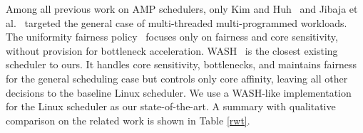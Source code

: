 Among all previous work on AMP schedulers, only Kim and Huh~\cite{kim2018exploring} and Jibaja et al.~\cite{jibaja2016portable} targeted the general case of multi-threaded multi-programmed workloads. The uniformity fairness policy~\cite{kim2018exploring} focuses only on fairness and core sensitivity, without provision for bottleneck acceleration. WASH~\cite{jibaja2016portable} is the closest existing scheduler to ours. It handles core sensitivity, bottlenecks, and maintains fairness for the general scheduling case but controls only core affinity, leaving all other decisions to the baseline Linux scheduler. We use a WASH-like implementation for the Linux scheduler  as our state-of-the-art. A summary with qualitative comparison on the related work is shown in Table \ref{rwt}.


